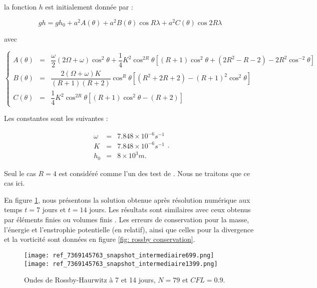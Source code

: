 la fonction $h$ est initialement donnée par :

\begin{equation}
gh = gh_0 + a^2 A(\theta) + a^2 B(\theta) \cos R \lambda + a^2 C(\theta) \cos 2 R \lambda 
\end{equation}

avec

\begin{equation}
\left\{
\begin{array}{rcl}
A(\theta) & = & \dfrac{\omega}{2} \left( 2 \Omega + \omega \right) \cos^2 \theta + \dfrac{1}{4} K^2 \cos^{2R} \theta 
\left[ (R+1) \cos^2 \theta+ (2R^2 -R -2) - 2R^2 \cos^{-2} \theta \right]\\
B(\theta) & = & \dfrac{2 (\Omega +\omega) K }{(R+1)(R+2)} \cos^R \theta 
\left[ (R^2 + 2R +2) - (R+1)^2 \cos^2 \theta  \right] \\
C(\theta) & = & \dfrac{1}{4} K^2 \cos^{2R} \theta \left[ (R+1) \cos^2 \theta - (R+2) \right]
\end{array}
\right.
\end{equation}

Les constantes sont les suivantes :

\begin{equation}
\begin{array}{rcl}
\omega & = & 7.848 \times 10^{-6} \si{s^{-1}}\\
K & = & 7.848 \times 10^{-6} \si{s^{-1}}\\
h_0 & = & 8 \times 10^3 \si{m}.
\end{array}.
\end{equation} 

Seul le cas $R=4$ est considéré comme l'un des test de \cite{Williamson1992}. Nous ne traitons que ce cas ici.

En figure \ref{fig: rossby 714}, nous présentons la solution obtenue après résolution numérique aux temps $t=7$ jours et $t=14$ jours. Les résultats sont similaires avec ceux obtenus par éléments finies ou volumes finis \cite{Galewsky2004, Chen2008}. Les erreurs de conservation pour la masse, l'énergie et l'enstrophie potentielle (en relatif), ainsi que celles pour la divergence et la vorticité sont données en figure \ref{fig: rossby conservation}.

\begin{figure}[htbp]
\begin{center}
\texttt{[image: ref\_7369145763\_snapshot\_intermediaire699.png]}
\texttt{[image: ref\_7369145763\_snapshot\_intermediaire1399.png]}
\end{center}
\caption{Ondes de Rossby-Haurwitz à 7 et 14 jours, $N=79$ et $CFL=0.9$.}
\label{fig: rossby 714}
\end{figure}

